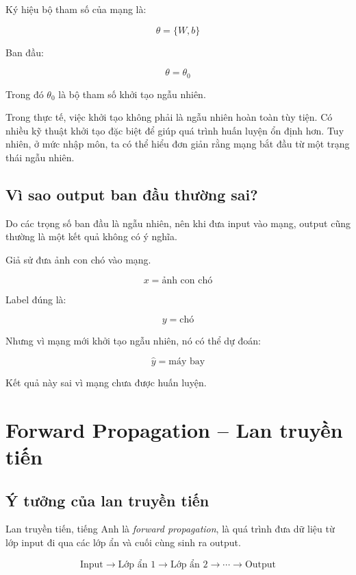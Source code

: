 Ký hiệu bộ tham số của mạng là:

\[
    \theta = \{W,b\}
\]

Ban đầu:

\[
    \theta = \theta_0
\]

Trong đó $\theta_0$ là bộ tham số khởi tạo ngẫu nhiên.

\begin{luuy}
Trong thực tế, việc khởi tạo không phải là ngẫu nhiên hoàn toàn tùy tiện. Có nhiều kỹ thuật khởi tạo đặc biệt để giúp quá trình huấn luyện ổn định hơn. Tuy nhiên, ở mức nhập môn, ta có thể hiểu đơn giản rằng mạng bắt đầu từ một trạng thái ngẫu nhiên.
\end{luuy}

\subsection{Vì sao output ban đầu thường sai?}

Do các trọng số ban đầu là ngẫu nhiên, nên khi đưa input vào mạng, output cũng thường là một kết quả không có ý nghĩa.

\begin{vidu}
Giả sử đưa ảnh con chó vào mạng.

\[
    x = \text{ảnh con chó}
\]

Label đúng là:

\[
    y = \text{chó}
\]

Nhưng vì mạng mới khởi tạo ngẫu nhiên, nó có thể dự đoán:

\[
    \hat{y} = \text{máy bay}
\]

Kết quả này sai vì mạng chưa được huấn luyện.
\end{vidu}

\section{Forward Propagation -- Lan truyền tiến}

\subsection{Ý tưởng của lan truyền tiến}

Lan truyền tiến, tiếng Anh là \textit{forward propagation}, là quá trình đưa dữ liệu từ lớp input đi qua các lớp ẩn và cuối cùng sinh ra output.

\[
    \text{Input} \rightarrow \text{Lớp ẩn 1} \rightarrow \text{Lớp ẩn 2} \rightarrow \cdots \rightarrow \text{Output}
\]

